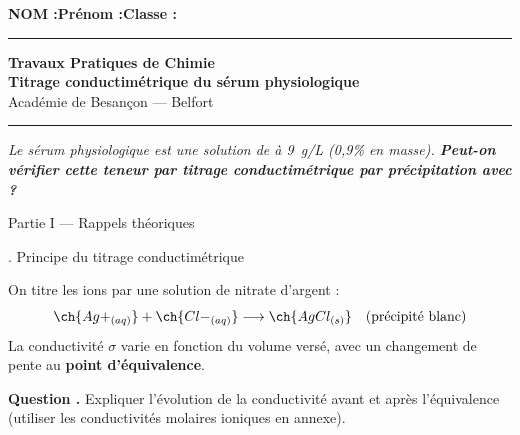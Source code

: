 \documentclass[11pt,a4paper]{article}
\newcommand{\sectitle}[1]{%
  \vspace{6pt}
  \noindent\colorbox{exoheader}{\parbox{\dimexpr\linewidth-2\fboxsep}%
    {\color{white}\bfseries\large\strut\quad #1}}
  \vspace{4pt}
}
\newcommand{\subsectitle}[1]{%
  \vspace{4pt}
  \noindent\colorbox{exolight}{\parbox{\dimexpr\linewidth-2\fboxsep}%
    {\color{exoheader}\bfseries\strut\quad #1}}
  \vspace{2pt}
}
\newcounter{question}
\newcommand{\question}{%
  \stepcounter{question}%
  \noindent\textcolor{exoheader}{\textbf{Question \thequestion.}}\quad
}
\begin{document}
\noindent\textbf{NOM :}\hfill\textbf{Prénom :}\hfill\textbf{Classe :}\hfill\phantom{x}\\[0.2cm]
\hrule\vspace{0.2cm}

\begin{center}
  {\large\bfseries\textcolor{exoheader}{Travaux Pratiques de Chimie}}\\[4pt]
  {\LARGE\bfseries Titrage conductimétrique du sérum physiologique}\\[2pt]
  {\small Académie de Besançon --- Belfort}
\end{center}
\hrule\vspace{6pt}

\begin{tcolorbox}[enhanced, colback=problemebg, colframe=exoheader, boxrule=1.5pt,
  title={\faFlask\quad Problématique},
  fonttitle=\bfseries\color{white},
  attach boxed title to top left={yshift=-2mm, xshift=4mm},
  boxed title style={colback=exoheader, colframe=exoheader}]
\textit{Le sérum physiologique est une solution de  à 9~g/L (0,9\% en masse).
\textbf{Peut-on vérifier cette teneur par titrage conductimétrique par précipitation avec  ?}}
\end{tcolorbox}

\vspace{6pt}

\sectitle{Partie I --- Rappels théoriques}

\subsectitle{1. Principe du titrage conductimétrique}

\begin{mdframed}[backgroundcolor=exolight, linecolor=exoheader, linewidth=1.2pt]
On titre les ions  par une solution de nitrate d'argent  :
\[
  \ch{Ag+_{(aq)}} + \ch{Cl-_{(aq)}} \longrightarrow \ch{AgCl_{(s)}} \quad \text{(précipité blanc)}
\]
La conductivité $\sigma$ varie en fonction du volume versé, avec un changement de pente
au \textbf{point d'équivalence}.
\end{mdframed}

\vspace{4pt}
\question Expliquer l'évolution de la conductivité avant et après l'équivalence
(utiliser les conductivités molaires ioniques en annexe). \dotfill

\vspace{0.3cm}\noindent\dotfill
\end{document}
